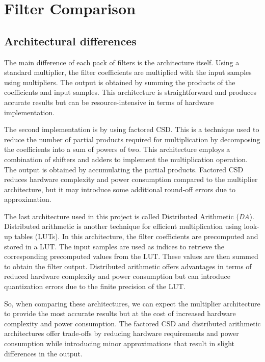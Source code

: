
\section{Filter Comparison}

\subsection{Architectural differences}
\label{sec:filter_comp_subsec:architectural_diff}
The main difference of each pack of filters is the architecture itself.
Using a standard multiplier, the filter coefficients are multiplied with the input samples using multipliers. The output is obtained by summing the products of the coefficients and input samples. This architecture is straightforward and produces accurate results but can be resource-intensive in terms of hardware implementation.

The second implementation is by using factored CSD. This is a technique used to reduce the number of partial products required for multiplication by decomposing the coefficients into a sum of powers of two. This architecture employs a combination of shifters and adders to implement the multiplication operation. The output is obtained by accumulating the partial products. Factored CSD reduces hardware complexity and power consumption compared to the multiplier architecture, but it may introduce some additional round-off errors due to approximation.

The last architecture used in this project is called Distributed Arithmetic (\emph{DA}).
Distributed arithmetic is another technique for efficient multiplication using look-up tables (LUTs). In this architecture, the filter coefficients are precomputed and stored in a LUT. The input samples are used as indices to retrieve the corresponding precomputed values from the LUT. These values are then summed to obtain the filter output. Distributed arithmetic offers advantages in terms of reduced hardware complexity and power consumption but can introduce quantization errors due to the finite precision of the LUT.

So, when comparing these architectures, we can expect the multiplier architecture to provide the most accurate results but at the cost of increased hardware complexity and power consumption.
The factored CSD and distributed arithmetic architectures offer trade-offs by reducing hardware requirements and power consumption while introducing minor approximations that result in slight differences in the output.

